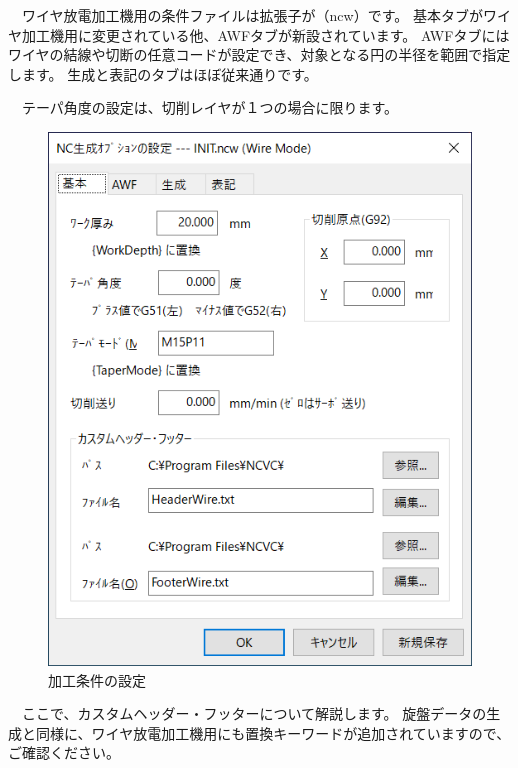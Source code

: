 \begin{minipage}[t]{0.4\textwidth}
　ワイヤ放電加工機用の条件ファイルは拡張子が（ncw）です。
基本タブがワイヤ加工機用に変更されている他、AWFタブが新設されています。
AWFタブにはワイヤの結線や切断の任意コードが設定でき、対象となる円の半径を範囲で指定します。
生成と表記のタブはほぼ従来通りです。

　テーパ角度の設定は、切削レイヤが１つの場合に限ります。
\end{minipage}
\begin{minipage}[t]{0.6\textwidth}
\vspace*{-2zh}
\begin{figure}[H]
\centering
\includegraphics[scale=0.7]{No1/fig/ncw1.png}
\caption{加工条件の設定}
\label{fig:ncw1.png}
\end{figure}
\end{minipage}

\vspace*{1zh}
　ここで、カスタムヘッダー・フッターについて解説します。
旋盤データの生成と同様に、ワイヤ放電加工機用にも置換キーワードが追加されていますので、ご確認ください。


